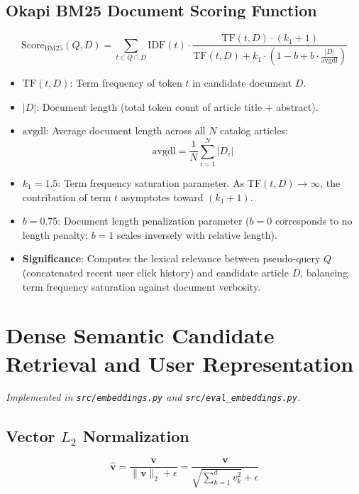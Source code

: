 \documentclass[11pt,a4paper]{article}
\begin{document}
\subsection{Okapi BM25 Document Scoring Function}
\begin{equation}
\text{Score}_{\text{BM25}}(Q, D) = \sum_{t \in Q \cap D} \text{IDF}(t) \cdot \frac{\text{TF}(t, D) \cdot (k_1 + 1)}{\text{TF}(t, D) + k_1 \cdot \left(1 - b + b \cdot \frac{|D|}{\text{avgdl}}\right)}
\end{equation}

\begin{itemize}
  \item $\text{TF}(t, D)$: Term frequency of token $t$ in candidate document $D$.
  \item $|D|$: Document length (total token count of article title + abstract).
  \item $\text{avgdl}$: Average document length across all $N$ catalog articles:
  \begin{equation}
  \text{avgdl} = \frac{1}{N}\sum_{i=1}^N |D_i|
  \end{equation}
  \item $k_1 = 1.5$: Term frequency saturation parameter. As $\text{TF}(t, D) \to \infty$, the contribution of term $t$ asymptotes toward $(k_1 + 1)$.
  \item $b = 0.75$: Document length penalization parameter ($b = 0$ corresponds to no length penalty; $b = 1$ scales inversely with relative length).
  \item \textbf{Significance}: Computes the lexical relevance between pseudo-query $Q$ (concatenated recent user click history) and candidate article $D$, balancing term frequency saturation against document verbosity.
\end{itemize}

\section{Dense Semantic Candidate Retrieval and User Representation}
\textit{Implemented in \texttt{src/embeddings.py} and \texttt{src/eval\_embeddings.py}.}

\subsection{Vector $L_2$ Normalization}
\begin{equation}
\mathbf{\hat{v}} = \frac{\mathbf{v}}{\|\mathbf{v}\|_2 + \epsilon} = \frac{\mathbf{v}}{\sqrt{\sum_{k=1}^d v_k^2} + \epsilon}
\end{equation}
\end{document}
